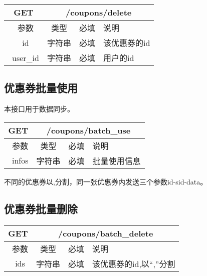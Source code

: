\begin{table}[H]
   \begin{center}
\begin{tabular}{|c|c|c|p{12cm}|}
\hline
GET & \multicolumn{3}{|c|}{/coupons/delete} \\
\hline\hline
 \  参数  & 类型 & 必填 &  说明  \\
\hline
 \  id  & 字符串 & 必填 &  该优惠券的id  \\
\hline
 \  user\_id  & 字符串 & 必填 &  用户的id  \\ 
\hline
\end{tabular}
   \end{center}
\end{table}


\subsection{优惠券批量使用}
本接口用于数据同步。

\begin{table}[H]
   \begin{center}
\begin{tabular}{|c|c|c|p{12cm}|}
\hline
GET & \multicolumn{3}{|c|}{/coupons/batch\_use} \\
\hline\hline
 \  参数  & 类型 & 必填 &  说明  \\
\hline
 \  infos  & 字符串 & 必填 &  批量使用信息 \\
\hline
\end{tabular}
   \end{center}
\end{table}
不同的优惠券以,分割，同一张优惠券内发送三个参数id-sid-data。



\subsection{优惠券批量删除}

\begin{table}[H]
   \begin{center}
\begin{tabular}{|c|c|c|p{12cm}|}
\hline
GET & \multicolumn{3}{|c|}{/coupons/batch\_delete} \\
\hline\hline
 \  参数  & 类型 & 必填 &  说明  \\
\hline
 \  ids  & 字符串 & 必填 &  该优惠券的id,以“,”分割  \\
\hline
\end{tabular}
   \end{center}
\end{table}



